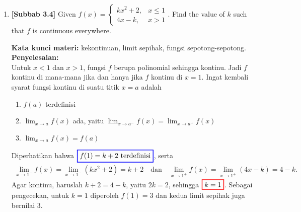 \documentclass[10pt,openany,a4paper]{article}
\theoremstyle{definition}
\theoremstyle{definition}
\theoremstyle{plain}
\newenvironment{jawab}[2][tes]{%
\par\noindent\textbf{Kata kunci materi:} #1.\\
\textbf{Penyelesaian:} #2%
}{}
\begin{document}
\begin{enumerate}
    \item \textbf{[Subbab 3.4]} Given $f(x)=\begin{cases}
        kx^2+2, & x\leq 1\\
        4x-k, & x>1
    \end{cases}$. Find the value of $k$ such that $f$ is continuous everywhere.
    \begin{jawab}[kekontinuan, limit sepihak, fungsi sepotong-sepotong]{~\\
        Untuk $x<1$ dan $x>1$, fungsi $f$ berupa polinomial sehingga kontinu. Jadi $f$ kontinu di mana-mana jika dan hanya jika $f$ kontinu di $x=1$. Ingat kembali syarat fungsi kontinu di suatu titik \(x = a\) adalah
        \begin{enumerate}
            \item \(f(a)\) terdefinisi
            \item \(\displaystyle \lim_{x \to a} f(x)\) ada, yaitu $\displaystyle \lim_{x \to a^-} f(x) = \lim_{x \to a^+} f(x)$
            \item \(\displaystyle\lim_{x \to a} f(x) = f(a)\)
        \end{enumerate}
        Diperhatikan bahwa $\colorlet{oldcolor}{.}
        \color{blue}
        \setlength{\fboxrule}{1pt} \boxed{\color{oldcolor}f(1)=k+2~\text{terdefinisi}}\color{oldcolor}$, serta
        \begin{align*}
            \lim_{x\to 1^-}f(x)=\lim_{x\to 1^-}(kx^2+2)=k+2 \quad\text{dan}\quad \lim_{x\to 1^+}f(x)=\lim_{x\to 1^+}(4x-k)=4-k.
        \end{align*}
        Agar kontinu, haruslah $k+2=4-k$, yaitu $2k=2$, sehingga $\colorlet{oldcolor}{.}
        \color{red}
        \setlength{\fboxrule}{1pt} \boxed{\color{oldcolor}k=1}\color{oldcolor}$. Sebagai pengecekan, untuk $k=1$ diperoleh $f(1)=3$ dan kedua limit sepihak juga bernilai $3$.
    }
    \end{jawab}


\end{enumerate}
\end{document}
